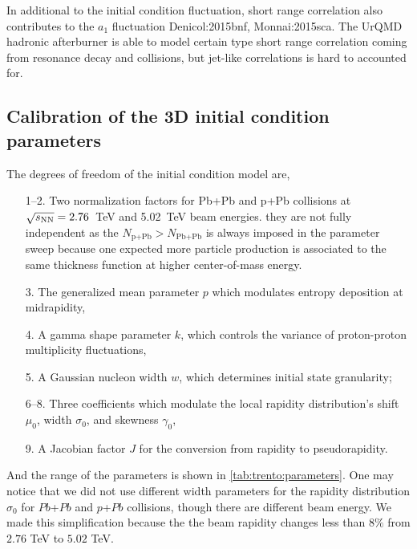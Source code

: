 In additional to the initial condition fluctuation, short range correlation also contributes to the $a_1$ fluctuation {Denicol:2015bnf, Monnai:2015sca}.
The UrQMD hadronic afterburner is able to model certain type short range correlation coming from resonance decay and collisions, but jet-like correlations is hard to accounted for.

\subsection{Calibration of the 3D initial condition parameters}
The degrees of freedom of the initial condition model are,
\begin{itemize}[itemsep=0pt]
  \item[1--2.] Two normalization factors for Pb+Pb and p+Pb collisions at $\sqrt{s_\mathrm{NN}}=2.76$~TeV and 5.02~TeV beam energies. they are not fully independent as the $N_{\textrm{p+Pb}} > N_{\textrm{Pb+Pb}}$ is always imposed in the parameter sweep because one expected more particle production is associated to the same thickness function at higher center-of-mass energy.
  \item[3.] The generalized mean parameter $p$ which modulates entropy deposition at midrapidity,
  \item[4.] A gamma shape parameter $k$, which controls the variance of proton-proton multiplicity fluctuations,
  \item[5.] A Gaussian nucleon width $w$, which determines initial state granularity;
  \item[6--8.] Three coefficients which modulate the local rapidity distribution's shift $\mu_0$, width $\sigma_0$, and skewness $\gamma_0$,
  \item[9.] A Jacobian factor $J$ for the conversion from rapidity to pseudorapidity.
\end{itemize}
And the range of the parameters is shown in \ref{tab:trento:parameters}.
One may notice that we did not use different width parameters for the rapidity distribution $\sigma_0$ for $Pb$+$Pb$ and $p$+$Pb$ collisions, though there are different beam energy.
We made this simplification because the the beam rapidity changes less than $8\%$ from $2.76$ TeV to $5.02$ TeV.

